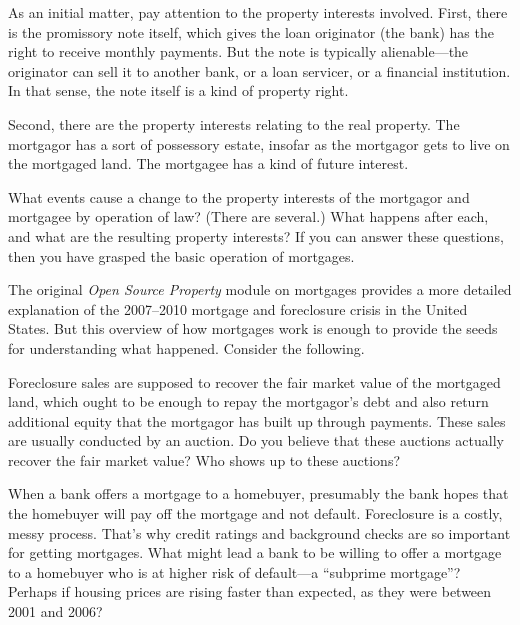 
\item As an initial matter, pay attention to the property interests involved.
First, there is the promissory note itself, which gives the loan originator (the
bank) has the right to receive monthly payments.
But the note is typically alienable---the originator can sell it to another
bank, or a loan servicer, or a financial institution. In that sense, the note
itself is a kind of property right.


\item Second, there are the property interests relating to the real property.
The mortgagor has a sort of possessory estate, insofar as the mortgagor gets to
live on the mortgaged land. The mortgagee has a kind of future interest.

What events cause a change to the
property interests of the mortgagor and mortgagee by operation of law? (There
are several.) What happens after each, and what are the resulting property
interests? If you can answer these questions, then you have grasped the basic
operation of mortgages.

\item The original \emph{Open Source Property} module on mortgages provides a
more detailed explanation of the 2007--2010 mortgage and foreclosure crisis in
the United States. But this overview of how mortgages work is enough to provide
the seeds for understanding what happened. Consider the following.

\item Foreclosure sales are supposed to recover the fair market value of the
mortgaged land, which ought to be enough to repay the mortgagor's debt and also
return additional equity that the mortgagor has built up through payments. These
sales are usually conducted by an auction. Do you believe that these auctions
actually recover the fair market value? Who shows up to these auctions?

\item When a bank offers a mortgage to a homebuyer, presumably the bank hopes
that the homebuyer will pay off the mortgage and not default. Foreclosure is a
costly, messy process. That's why credit ratings and background checks are so
important for getting mortgages. What might lead a bank to be willing to offer a
mortgage to a homebuyer who is at higher risk of default---a ``subprime
mortgage''? Perhaps if housing prices are rising faster than expected, as they
were between 2001 and 2006?

